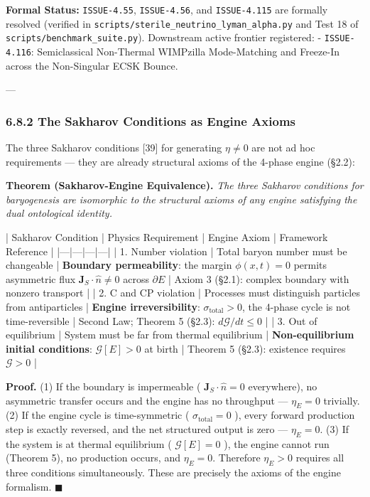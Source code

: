 \documentclass[11pt,a4paper]{article}
\theoremstyle{definition}
\theoremstyle{remark}
\begin{document}
\textbf{Formal Status:} \texttt{ISSUE-4.55}, \texttt{ISSUE-4.56}, and \texttt{ISSUE-4.115} are formally resolved (verified in \texttt{scripts/sterile_neutrino_lyman_alpha.py} and Test 18 of \texttt{scripts/benchmark_suite.py}). Downstream active frontier registered:
- \texttt{ISSUE-4.116}: Semiclassical Non-Thermal WIMPzilla Mode-Matching and Freeze-In across the Non-Singular ECSK Bounce.

---

\subsubsection{6.8.2 The Sakharov Conditions as Engine Axioms}

The three Sakharov conditions [39] for generating $\eta \neq 0$ are not ad hoc requirements — they are already structural axioms of the 4-phase engine (\S 2.2):

\textbf{Theorem (Sakharov-Engine Equivalence).} \textit{The three Sakharov conditions for baryogenesis are isomorphic to the structural axioms of any engine satisfying the dual ontological identity.}

| Sakharov Condition | Physics Requirement | Engine Axiom | Framework Reference |
|---|---|---|---|
| 1. Number violation | Total baryon number must be changeable | \textbf{Boundary permeability}: the margin $\phi(x,t) = 0$ permits asymmetric flux $\mathbf{J}_S \cdot \hat{n} \neq 0$ across $\partial E$ | Axiom 3 (\S 2.1): complex boundary with nonzero transport |
| 2. C and CP violation | Processes must distinguish particles from antiparticles | \textbf{Engine irreversibility}: $\sigma_{\text{total}} > 0$, the 4-phase cycle is not time-reversible | Second Law; Theorem 5 (\S 2.3): $d\mathcal{G}/dt \leq 0$ |
| 3. Out of equilibrium | System must be far from thermal equilibrium | \textbf{Non-equilibrium initial conditions}: $\mathcal{G}[E] > 0$ at birth | Theorem 5 (\S 2.3): existence requires $\mathcal{G} > 0$ |

\textbf{Proof.} (1) If the boundary is impermeable ( $\mathbf{J}_S \cdot \hat{n} = 0$ everywhere), no asymmetric transfer occurs and the engine has no throughput — $\eta_E = 0$ trivially. (2) If the engine cycle is time-symmetric ( $\sigma_{\text{total}} = 0$ ), every forward production step is exactly reversed, and the net structured output is zero — $\eta_E = 0$. (3) If the system is at thermal equilibrium ( $\mathcal{G}[E] = 0$ ), the engine cannot run (Theorem 5), no production occurs, and $\eta_E = 0$. Therefore $\eta_E > 0$ requires all three conditions simultaneously. These are precisely the axioms of the engine formalism. $\blacksquare$
\end{document}
